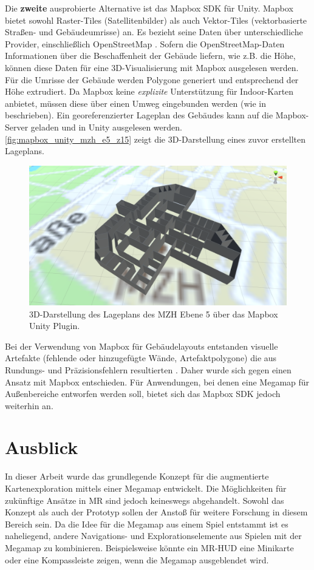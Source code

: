 Die \textbf{zweite} ausprobierte Alternative ist das Mapbox SDK für Unity.
Mapbox bietet sowohl Raster-Tiles (Satellitenbilder) als auch Vektor-Tiles (vektorbasierte Straßen- und Gebäudeumrisse) an.
Es bezieht seine Daten über unterschiedliche Provider, einschließlich OpenStreetMap \autocite{Mapbox2018}.
Sofern die OpenStreetMap-Daten Informationen über die Beschaffenheit der Gebäude liefern, wie z.B. die Höhe, können diese Daten für eine 3D-Visualisierung mit Mapbox ausgelesen werden.
Für die Umrisse der Gebäude werden Polygone generiert und entsprechend der Höhe extrudiert.
Da Mapbox keine \emph{explizite} Unterstützung für Indoor-Karten anbietet, müssen diese über einen Umweg eingebunden werden (wie in \cite{Mapbox2018b, Pavani2018, Clarke2017} beschrieben).
Ein georeferenzierter Lageplan des Gebäudes kann auf die Mapbox-Server geladen und in Unity ausgelesen werden.
\autoref{fig:mapbox_unity_mzh_e5_z15} zeigt die 3D-Darstellung eines zuvor erstellten Lageplans.
\begin{figure}[h]
    \centering
    \includegraphics[width=0.65\linewidth]{figures/mapbox_unity_mzh_e5_z15_working}
    \caption{3D-Darstellung des Lageplans des MZH Ebene 5 über das Mapbox Unity Plugin.}
    \label{fig:mapbox_unity_mzh_e5_z15}
\end{figure}
Bei der Verwendung von Mapbox für Gebäudelayouts entstanden visuelle Artefakte (fehlende oder hinzugefügte Wände, Artefaktpolygone) die aus Rundungs- und Präzisionsfehlern resultierten \parencite{Kahyaoglu2017, Mapbox2018c}.
Daher wurde sich gegen einen Ansatz mit Mapbox entschieden.
Für Anwendungen, bei denen eine Megamap für Außenbereiche entworfen werden soll, bietet sich das Mapbox SDK jedoch weiterhin an.

\section{Ausblick}
In dieser Arbeit wurde das grundlegende Konzept für die augmentierte Kartenexploration mittels einer Megamap entwickelt.
Die Möglichkeiten für zukünftige Ansätze in MR sind jedoch keineswegs abgehandelt.
Sowohl das Konzept als auch der Prototyp sollen der Anstoß für weitere Forschung in diesem Bereich sein.
Da die Idee für die Megamap aus einem Spiel entstammt ist es naheliegend, andere Navigations- und Explorationselemente aus Spielen mit der Megamap zu kombinieren.
Beispielsweise könnte ein MR-HUD eine Minikarte oder eine Kompassleiste zeigen, wenn die Megamap ausgeblendet wird.


